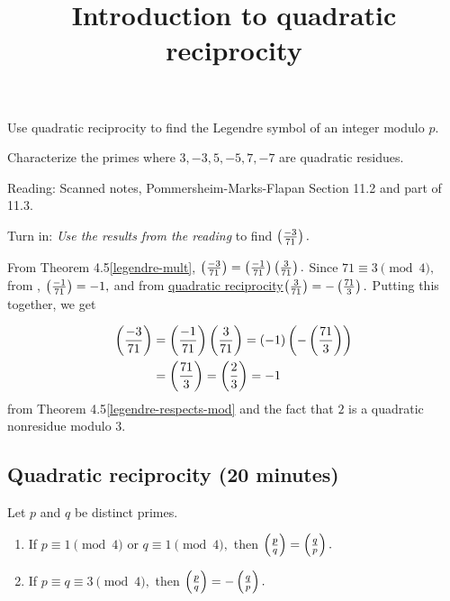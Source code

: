 \documentclass{../ximera}
\title{Introduction to quadratic reciprocity}
\begin{document}
\begin{abstract}
\end{abstract}
\maketitle


\begin{obj}
    \item Use quadratic reciprocity to find the Legendre symbol of an integer modulo $p$.
    \item Characterize the primes where $3,-3,5,-5,7,-7$ are quadratic residues.
\end{obj}


\begin{pre}
    \item[Reading:] Scanned notes, Pommersheim-Marks-Flapan Section 11.2 and part of 11.3.
    \item[Turn in:] \emph{Use the results from the reading} to find $\left(\frac{-3}{71}\right).$

     \begin{solution}
     	From Theorem 4.5\ref{legendre-mult}, $\left(\frac{-3}{71}\right)=\left(\frac{-1}{71}\right)\left(\frac{3}{71}\right).$
     	Since $71\equiv3\pmod{4},$ from , $\left(\frac{-1}{71}\right)=-1,$
	and from \hyperref[quad-rec-useful-form]{quadratic reciprocity}$\left(\frac{3}{71}\right)=-\left(\frac{71}{3}\right).$ Putting this together, we get
	
		\begin{align*}
		 	\left(\frac{-3}{71}\right)&=\left(\frac{-1}{71}\right)\left(\frac{3}{71}\right)=(-1)\left(-\left(\frac{71}{3}\right)\right)\\
				&=\left(\frac{71}{3}\right)=\left(\frac{2}{3}\right)=-1
		\end{align*}
	from Theorem 4.5\ref{legendre-respects-mod} and the fact that $2$ is a quadratic nonresidue modulo $3.$
     \end{solution}
\end{pre}


\subsection{Quadratic reciprocity (20 minutes)}

\begin{thm*}\label{quad-rec-useful-form}
	Let $p$ and $q$ be distinct primes.  
	\begin{enumerate}[label=(\alph*)]
		\item If $p\equiv 1 \pmod{4}$ or $q\equiv 1\pmod{4},$ then $\left(\frac{p}{q}\right)=\left(\frac{q}{p}\right).$
 		\item If $p\equiv q \equiv 3 \pmod{4},$ then $\left(\frac{p}{q}\right)=-\left(\frac{q}{p}\right).$
	\end{enumerate}
\end{thm*}
\end{document}
